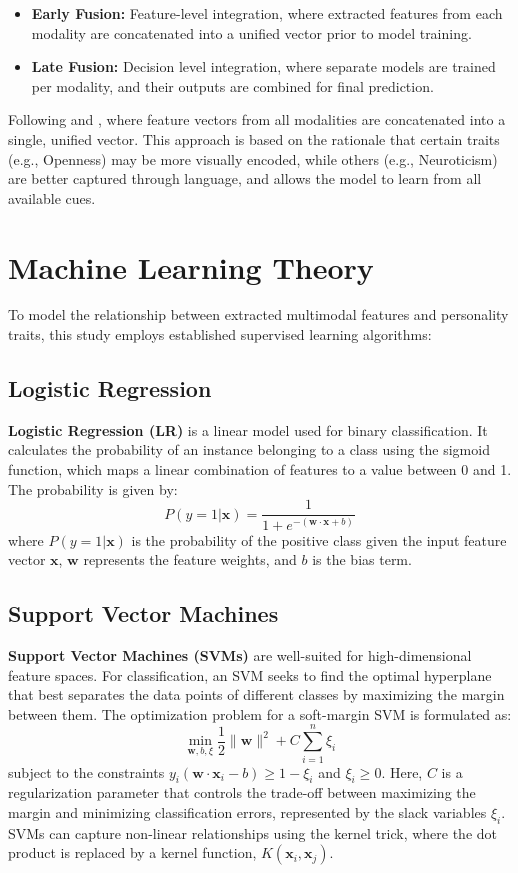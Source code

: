 \begin{itemize}
	\item \textbf{Early Fusion:} Feature-level integration, where extracted features from each modality are concatenated into a unified vector prior to model training.
	\item \textbf{Late Fusion:} Decision level integration, where separate models are trained per modality, and their outputs are combined for final prediction.
\end{itemize}

Following \citet{liu2022} and \citet{kampman2018}, where feature vectors from all modalities are concatenated into a single, unified vector. This approach is based on the rationale that certain traits (e.g., Openness) may be more visually encoded, while others (e.g., Neuroticism) are better captured through language, and allows the model to learn from all available cues.

\section{Machine Learning Theory}

To model the relationship between extracted multimodal features and personality traits, this study employs established supervised learning algorithms:

\subsection{Logistic Regression}
\textbf{Logistic Regression (LR)} is a linear model used for binary classification. It calculates the probability of an instance belonging to a class using the sigmoid function, which maps a linear combination of features to a value between 0 and 1. The probability is given by:
$$P(y=1 | \mathbf{x}) = \frac{1}{1 + e^{-(\mathbf{w} \cdot \mathbf{x} + b)}}$$
where $P(y=1|\mathbf{x})$ is the probability of the positive class given the input feature vector $\mathbf{x}$, $\mathbf{w}$ represents the feature weights, and $b$ is the bias term.

\subsection{Support Vector Machines}
\textbf{Support Vector Machines (SVMs)} are well-suited for high-dimensional feature spaces. For classification, an SVM seeks to find the optimal hyperplane that best separates the data points of different classes by maximizing the margin between them. The optimization problem for a soft-margin SVM is formulated as:
$$\min_{\mathbf{w}, b, \xi} \frac{1}{2} \|\mathbf{w}\|^2 + C \sum_{i=1}^{n} \xi_i$$
subject to the constraints $y_i(\mathbf{w} \cdot \mathbf{x}_i - b) \geq 1 - \xi_i$ and $\xi_i \geq 0$. Here, $C$ is a regularization parameter that controls the trade-off between maximizing the margin and minimizing classification errors, represented by the slack variables $\xi_i$. SVMs can capture non-linear relationships using the kernel trick, where the dot product is replaced by a kernel function, $K(\mathbf{x}_i, \mathbf{x}_j)$.

